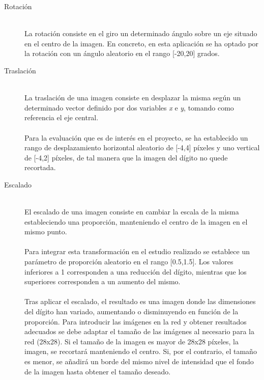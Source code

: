 \begin{description}
	\item[Rotación] \hfill 
	\vspace{5pt}
	\\
	La rotación consiste en el giro un determinado ángulo sobre un eje situado en el centro de la imagen. En concreto, en esta aplicación se ha optado por la rotación con un ángulo aleatorio en el rango [-20,20] grados.
	\vspace{5pt}
	\item[Traslación] \hfill 
	\vspace{5pt}
	\\
	La traslación de una imagen consiste en desplazar la misma según un determinado vector definido por dos variables \textit{x} e \textit{y}, tomando como referencia el eje central.\\
	\vspace{-10pt}
	\\
	Para la evaluación que es de interés en el proyecto, se ha establecido un rango de desplazamiento horizontal aleatorio de [-4,4] píxeles y uno vertical de [-4,2] píxeles, de tal manera que la imagen del dígito no quede recortada.
	\vspace{5pt}
	\item[Escalado] \hfill 
	\vspace{5pt}
	\\
	El escalado de una imagen consiste en cambiar la escala de la misma estableciendo una proporción, manteniendo el centro de la imagen en el mismo punto.\\
	\vspace{-10pt}
	\\
	Para integrar esta transformación en el estudio realizado se establece un parámetro de proporción aleatorio en el rango [0.5,1.5]. Los valores inferiores a 1 corresponden a una reducción del dígito, mientras que los superiores corresponden a un aumento del mismo.\\
	\vspace{-10pt}
	\\
	Tras aplicar el escalado, el resultado es una imagen donde las dimensiones del dígito han variado, aumentando o disminuyendo en función de la proporción. Para introducir las imágenes en la red y obtener resultados adecuados se debe adaptar el tamaño de las imágenes al necesario para la red (28x28). Si el tamaño de la imagen es mayor de 28x28 píxeles, la imagen, se recortará manteniendo el centro. Si, por el contrario, el tamaño es menor, se añadirá un borde del mismo nivel de intensidad que el fondo de la imagen hasta obtener el tamaño deseado.

\end{description}
